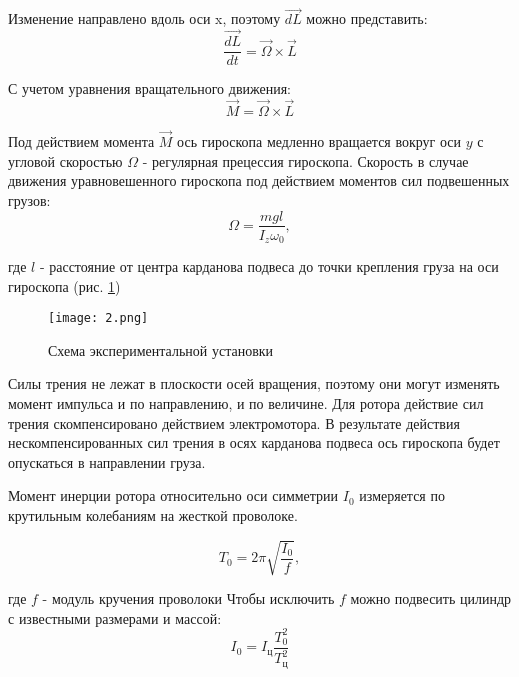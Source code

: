     Изменение направлено вдоль оси x, поэтому $\overrightarrow{dL}$ можно представить:
    \begin{equation}
        \frac{\overrightarrow{dL}}{dt}=\overrightarrow{\Omega}\times\overrightarrow{L}
    \end{equation}
    
    С учетом уравнения вращательного движения:
    \begin{equation}
        \overrightarrow{M}=\overrightarrow{\Omega}\times\overrightarrow{L}
    \end{equation}
        
    Под действием момента $\overrightarrow{M}$ ось гироскопа медленно вращается вокруг оси $y$ с угловой скоростью $\Omega$ - регулярная прецессия гироскопа.
    Скорость в случае движения уравновешенного гироскопа под действием моментов сил подвешенных грузов:
    \begin{equation}
        \label{связь омег}
        \Omega = \frac{mgl}{I_z\omega_0},
    \end{equation}
    
    где $l$ - расстояние от центра карданова подвеса до точки крепления груза на оси гироскопа (рис. \ref{схема})
    \begin{figure}[h!]
        \begin{center}
        \texttt{[image: 2.png]}
        \end{center}
        \caption{Схема экспериментальной установки} \label{схема}
    \end{figure}
    
    
    Силы трения не лежат в плоскости осей вращения, поэтому они могут изменять момент импульса и по направлению, и по величине. Для ротора действие сил трения скомпенсировано действием электромотора. В результате действия нескомпенсированных сил трения в осях карданова подвеса ось гироскопа будет опускаться в направлении груза.
    
    Момент инерции ротора относительно оси симметрии $I_0$ измеряется по крутильным колебаниям на жесткой проволоке. 
    
    \begin{equation}
        T_0 = 2\pi\sqrt{\frac{I_0}{f}},
    \end{equation}
    
    где $f$ - модуль кручения проволоки
    Чтобы исключить $f$ можно подвесить цилиндр с известными размерами и массой:
    \begin{equation}
        I_0 = I_\text{ц}\frac{T_0^2}{T_\text{ц}^2}
    \end{equation}